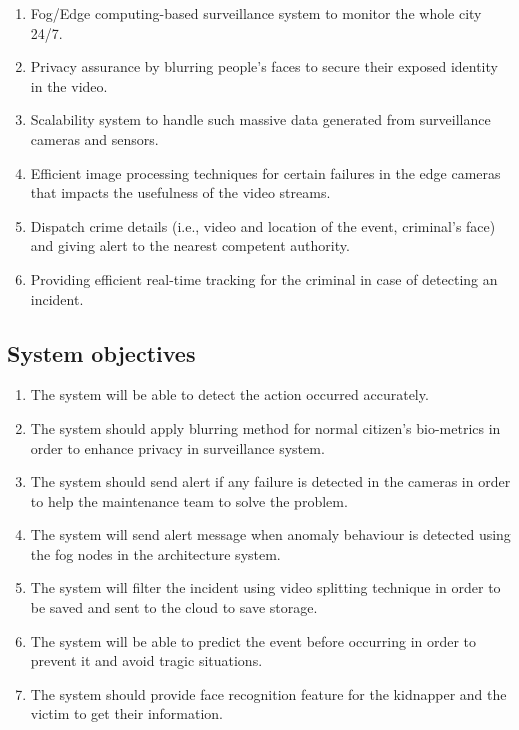 \documentclass[12pt]{article}
\begin{document}
\begin{enumerate}
\item Fog/Edge computing-based surveillance system to monitor the whole city 24/7.

\item Privacy assurance by blurring people’s faces to secure their exposed identity in the video.
\item Scalability system to handle such massive data generated from surveillance cameras and sensors.
\item Efficient image processing techniques for certain failures in the edge cameras that impacts the usefulness of the video streams.
\item Dispatch crime details (i.e., video and location of the event, criminal’s face) and giving alert to the nearest competent authority.

\item Providing efficient real-time tracking for the criminal in case of detecting an incident.

\end{enumerate} 

\subsection{System objectives}
\begin{enumerate}


\item The system will be able to detect the action occurred accurately.

\item The system should apply blurring method for normal citizen’s bio-metrics in order to enhance privacy in surveillance system.
\item The system should send alert if any failure is detected in the cameras in order to help the maintenance team to solve the problem.
\item The system will send alert message when anomaly behaviour is detected using the fog nodes in the architecture system.

\item The system will filter the incident using video splitting technique in order to be saved and sent to the cloud to save storage.
\item The system will be able to predict the event before occurring in order to prevent it and avoid tragic situations.
\item The system should provide face recognition feature for the kidnapper and the victim to get their information.
 \end{enumerate}
 
\end{document}
